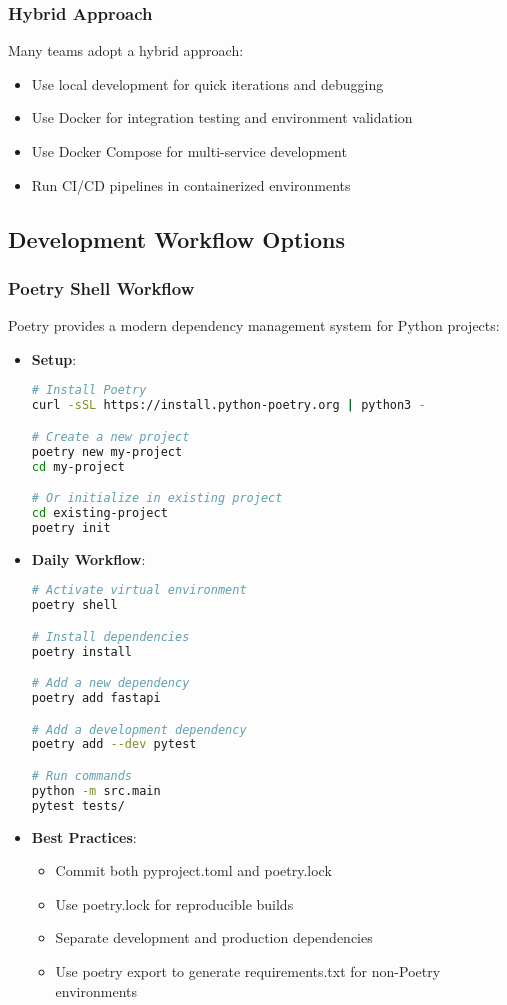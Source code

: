 \subsubsection{Hybrid Approach}
Many teams adopt a hybrid approach:

\begin{itemize}
    \item Use local development for quick iterations and debugging
    \item Use Docker for integration testing and environment validation
    \item Use Docker Compose for multi-service development
    \item Run CI/CD pipelines in containerized environments
\end{itemize}

\subsection{Development Workflow Options}

\subsubsection{Poetry Shell Workflow}
Poetry provides a modern dependency management system for Python projects:

\begin{itemize}
    \item \textbf{Setup}:
    \begin{lstlisting}[language=bash]
# Install Poetry
curl -sSL https://install.python-poetry.org | python3 -

# Create a new project
poetry new my-project
cd my-project

# Or initialize in existing project
cd existing-project
poetry init
    \end{lstlisting}
    
    \item \textbf{Daily Workflow}:
    \begin{lstlisting}[language=bash]
# Activate virtual environment
poetry shell

# Install dependencies
poetry install

# Add a new dependency
poetry add fastapi

# Add a development dependency
poetry add --dev pytest

# Run commands
python -m src.main
pytest tests/
    \end{lstlisting}
    
    \item \textbf{Best Practices}:
    \begin{itemize}
        \item Commit both pyproject.toml and poetry.lock
        \item Use poetry.lock for reproducible builds
        \item Separate development and production dependencies
        \item Use poetry export to generate requirements.txt for non-Poetry environments
    \end{itemize}
\end{itemize}

